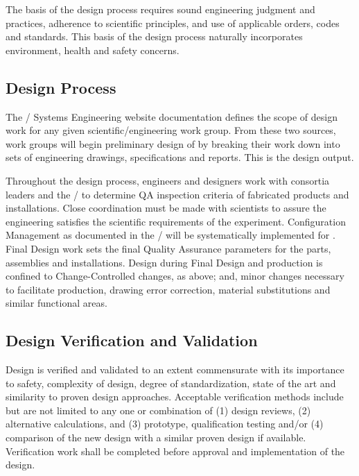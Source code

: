 The basis of the design process requires sound engineering judgment
and practices, adherence to scientific principles, and use of
applicable orders, codes and standards. This basis of the design
process naturally incorporates environment, health and safety
concerns.

\subsection{Design Process}

The / Systems Engineering website
documentation defines the scope of design work for any given
scientific/engineering work group. From these two sources, work groups
will begin preliminary design of  by breaking their work
down into sets of engineering drawings, specifications and
reports. This is the design output.

Throughout the design process, engineers and designers work with
consortia leaders and the /  to
determine QA inspection criteria of fabricated products and
installations. Close coordination must be made with 
scientists to assure the engineering satisfies the scientific
requirements of the experiment. Configuration Management as documented
in the /  will be
systematically implemented for . Final Design work sets
the final Quality Assurance parameters for the parts, assemblies and
installations. Design during Final Design and production is confined
to Change-Controlled changes, as above; and, minor changes necessary
to facilitate production, drawing error correction, material
substitutions and similar functional areas.

\subsection{Design Verification and Validation}

Design is verified and validated to an extent commensurate with its
importance to safety, complexity of design, degree of standardization,
state of the art and similarity to proven design
approaches. Acceptable verification methods include but are not
limited to any one or combination of (1) design reviews, (2)
alternative calculations, and (3) prototype, qualification testing
and/or (4) comparison of the new design with a similar proven design
if available. Verification work shall be completed before approval and
implementation of the design.

